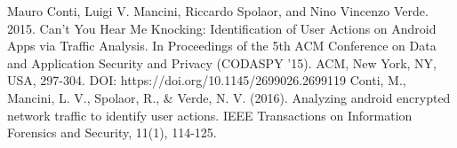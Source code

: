 \documentclass[a4paper,10pt]{report}
\begin{document}
\begin{thebibliography}{99}
Mauro Conti, Luigi V. Mancini, Riccardo Spolaor, and Nino Vincenzo Verde. 2015. Can't You Hear Me Knocking: Identification of User Actions on Android Apps via Traffic Analysis. In Proceedings of the 5th ACM Conference on Data and Application Security and Privacy (CODASPY '15). ACM, New York, NY, USA, 297-304. DOI: https://doi.org/10.1145/2699026.2699119
 Conti, M., Mancini, L. V., Spolaor, R., \& Verde, N. V. (2016). Analyzing android encrypted network traffic to identify user actions. IEEE Transactions on Information Forensics and Security, 11(1), 114-125.

\end{thebibliography}
\end{document}
